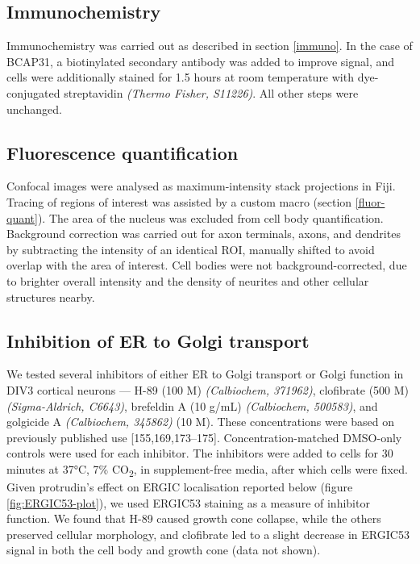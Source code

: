 \documentclass[
  12pt,
  a4paper,
]{book}
\begin{document}
\hypertarget{immunochemistry}{%
\subsection{Immunochemistry}\label{immunochemistry}}

Immunochemistry was carried out as described in section \ref{immuno}. In the case of BCAP31, a biotinylated secondary antibody was added to improve signal, and cells were additionally stained for 1.5 hours at room temperature with dye-conjugated streptavidin \emph{(Thermo Fisher, S11226)}. All other steps were unchanged.

\hypertarget{fluorescence-quantification}{%
\subsection{Fluorescence quantification}\label{fluorescence-quantification}}

Confocal images were analysed as maximum-intensity stack projections in Fiji. Tracing of regions of interest was assisted by a custom macro (section \ref{fluor-quant}). The area of the nucleus was excluded from cell body quantification. Background correction was carried out for axon terminals, axons, and dendrites by subtracting the intensity of an identical ROI, manually shifted to avoid overlap with the area of interest. Cell bodies were not background-corrected, due to brighter overall intensity and the density of neurites and other cellular structures nearby.

\hypertarget{inhibition-of-er-to-golgi-transport}{%
\subsection{Inhibition of ER to Golgi transport}\label{inhibition-of-er-to-golgi-transport}}

We tested several inhibitors of either ER to Golgi transport or Golgi function in DIV3 cortical neurons --- H-89 (100 \textmu{}M) \emph{(Calbiochem, 371962)}, clofibrate (500 \textmu{}M) \emph{(Sigma-Aldrich, C6643)}, brefeldin A (10 \textmu{}g/mL) \emph{(Calbiochem, 500583)}, and golgicide A \emph{(Calbiochem, 345862)} (10 \textmu{}M). These concentrations were based on previously published use {[}155,169,173--175{]}. Concentration-matched DMSO-only controls were used for each inhibitor. The inhibitors were added to cells for 30 minutes at 37°C, 7\% CO\textsubscript{2}, in supplement-free media, after which cells were fixed. Given protrudin's effect on ERGIC localisation reported below (figure \ref{fig:ERGIC53-plot}), we used ERGIC53 staining as a measure of inhibitor function. We found that H-89 caused growth cone collapse, while the others preserved cellular morphology, and clofibrate led to a slight decrease in ERGIC53 signal in both the cell body and growth cone (data not shown).
\end{document}

